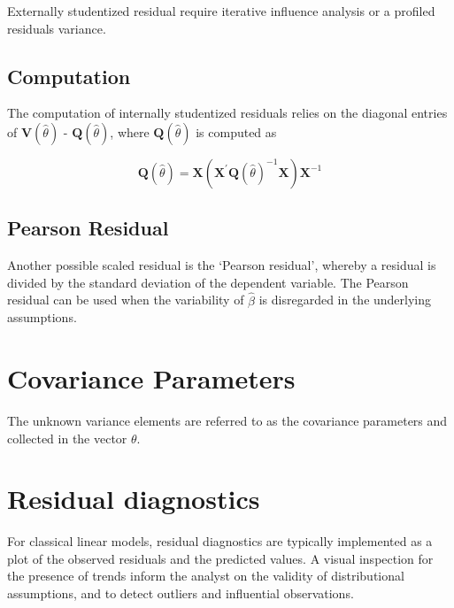 \documentclass[Main.tex]{subfiles}
\begin{document}
Externally  studentized residual require iterative influence analysis or a profiled residuals variance.




\subsection{Computation}%


The computation of internally studentized residuals relies on the diagonal entries of $\boldsymbol{V} (\hat{\theta})$ - $\boldsymbol{Q} (\hat{\theta})$, where $\boldsymbol{Q} (\hat{\theta})$ is computed as


\[ \boldsymbol{Q} (\hat{\theta}) = \boldsymbol{X} ( \boldsymbol{X}^{\prime}\boldsymbol{Q} (\hat{\theta})^{-1}\boldsymbol{X})\boldsymbol{X}^{-1} \]


\subsection{Pearson Residual}%


Another possible scaled residual is the  `Pearson residual', whereby a residual is divided by the standard deviation of the dependent variable. The Pearson residual can be used when the variability of $\hat{\beta}$ is disregarded in the underlying assumptions.


\newpage
\section{Covariance Parameters} %
The unknown variance elements are referred to as the covariance parameters and collected in the vector $\theta$.



\section{Residual diagnostics} %
For classical linear models, residual diagnostics are typically implemented as a plot of the observed residuals and the predicted values. A visual inspection for the presence of trends inform the analyst on the validity of distributional assumptions, and to detect outliers and influential observations.
\end{document}
